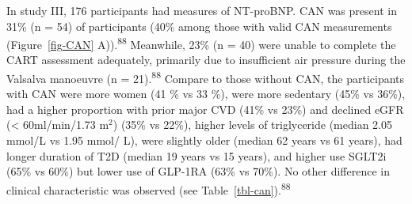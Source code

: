 \documentclass[
  a4paper,
  headsepline=true,
  open=left]{scrbook}
\begin{document}
In study III, 176 participants had measures of NT-proBNP. CAN was
present in 31\% (n = 54) of participants (40\% among those with valid
CAN measurements (Figure~\ref{fig-CAN} A)).\textsuperscript{88}
Meanwhile, 23\% (n = 40) were unable to complete the CART assessment
adequately, primarily due to insufficient air pressure during the
Valsalva manoeuvre (n = 21).\textsuperscript{88} Compare to those
without CAN, the participants with CAN were more women (41 \% vs 33 \%),
were more sedentary (45\% vs 36\%), had a higher proportion with prior
major CVD (41\% vs 23\%) and declined eGFR (\textless{} 60ml/min/1.73
m\(^2\)) (35\% vs 22\%), higher levels of triglyceride (median 2.05
mmol/L vs 1.95 mmol/ L), were slightly older (median 62 years vs 61
years), had longer duration of T2D (median 19 years vs 15 years), and
higher use SGLT2i (65\% vs 60\%) but lower use of GLP-1RA (63\% vs
70\%). No other difference in clinical characteristic was observed (see
Table~\ref{tbl-can}).\textsuperscript{88}

\end{document}
